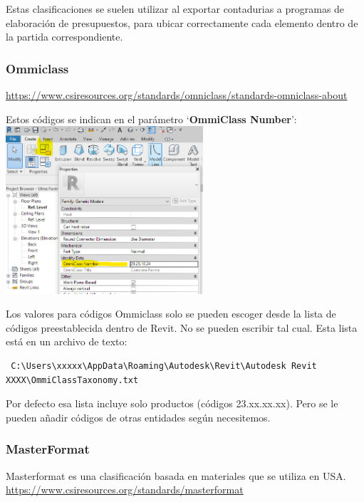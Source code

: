 \documentclass[spanish,12pt,a4paper,final,oneside]{book}
\begin{document}
Estas clasificaciones se suelen utilizar al exportar contadurias a programas de elaboración de presupuestos, para ubicar correctamente cada elemento dentro de la partida correspondiente.

\subsubsection{Ommiclass}
\url{https://www.csiresources.org/standards/omniclass/standards-omniclass-about}

Estos códigos se indican en el parámetro `\textbf{OmmiClass Number}':
\\ \includegraphics[width=0.55\textwidth]{parametro para el codigo Ommiclass}

Los valores para códigos Ommiclass solo se pueden escoger desde la lista de códigos preestablecida dentro de Revit. No se pueden escribir tal cual. Esta lista está en un archivo de texto: \begin{verbatim} C:\Users\xxxxx\AppData\Roaming\Autodesk\Revit\Autodesk Revit XXXX\OmmiClassTaxonomy.txt
\end{verbatim}
Por defecto esa lista incluye solo productos (códigos 23.xx.xx.xx). Pero se le pueden añadir códigos de otras entidades según necesitemos.

\subsubsection{MasterFormat}
Masterformat es una clasificación basada en materiales que se utiliza en USA.
\\ \url{https://www.csiresources.org/standards/masterformat}
\end{document}
